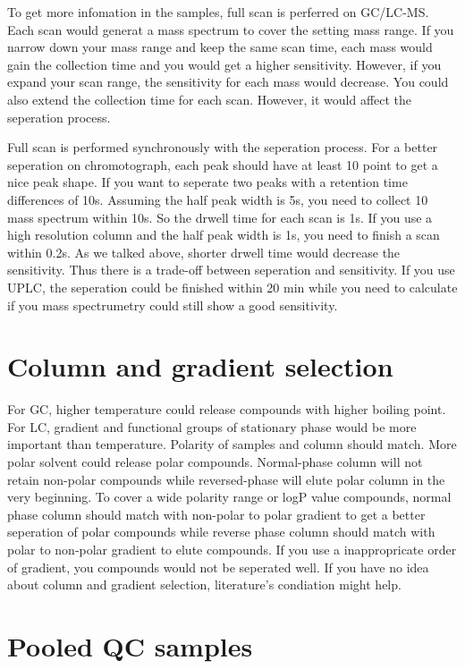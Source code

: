 \documentclass[
]{book}
\begin{document}
To get more infomation in the samples, full scan is perferred on GC/LC-MS. Each scan would generat a mass spectrum to cover the setting mass range. If you narrow down your mass range and keep the same scan time, each mass would gain the collection time and you would get a higher sensitivity. However, if you expand your scan range, the sensitivity for each mass would decrease. You could also extend the collection time for each scan. However, it would affect the seperation process.

Full scan is performed synchronously with the seperation process. For a better seperation on chromotograph, each peak should have at least 10 point to get a nice peak shape. If you want to seperate two peaks with a retention time differences of 10s. Assuming the half peak width is 5s, you need to collect 10 mass spectrum within 10s. So the drwell time for each scan is 1s. If you use a high resolution column and the half peak width is 1s, you need to finish a scan within 0.2s. As we talked above, shorter drwell time would decrease the sensitivity. Thus there is a trade-off between seperation and sensitivity. If you use UPLC, the seperation could be finished within 20 min while you need to calculate if you mass spectrumetry could still show a good sensitivity.

\hypertarget{column-and-gradient-selection}{%
\section{Column and gradient selection}\label{column-and-gradient-selection}}

For GC, higher temperature could release compounds with higher boiling point. For LC, gradient and functional groups of stationary phase would be more important than temperature. Polarity of samples and column should match. More polar solvent could release polar compounds. Normal-phase column will not retain non-polar compounds while reversed-phase will elute polar column in the very beginning. To cover a wide polarity range or logP value compounds, normal phase column should match with non-polar to polar gradient to get a better seperation of polar compounds while reverse phase column should match with polar to non-polar gradient to elute compounds. If you use a inappropricate order of gradient, you compounds would not be seperated well. If you have no idea about column and gradient selection, literature's condiation might help.

\hypertarget{pooled-qc-samples}{%
\section{Pooled QC samples}\label{pooled-qc-samples}}
\end{document}
